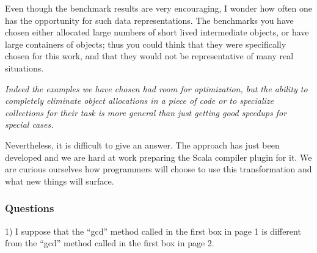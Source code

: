 \documentclass[9pt]{article}
\newenvironment{packed_item}{
\begin{itemize}
  \setlength{\itemsep}{1pt}
  \setlength{\parskip}{0.2pt}
  \setlength{\parsep}{0.2pt}
}{
  \end{itemize}
}
\newenvironment{reviewer-addr}
{ \color{OliveGreen} \framebox{{\bf FEEDBACK}} }
{  }
\newenvironment{answer}
{ \em \framebox{{\bf AUTHOR RESPONSE}} }
{  }
\begin{document}
\vspace{5mm}

\begin{reviewer-addr}
\begin{packed_item}
\item Even though the benchmark results are very encouraging, I wonder how often one has
the opportunity for such data representations. The benchmarks you have chosen either
allocated large numbers of short lived intermediate objects, or have large containers of
objects; thus you could think that they were specifically chosen for this work, and that
they would not be representative of many real situations.
\end{packed_item}
\end{reviewer-addr}

\begin{answer}
Indeed the examples we have chosen had room for optimization,
but the ability to completely eliminate object allocations in a piece of code or to specialize collections
for their task is more general than just getting good speedups for special cases.

Nevertheless, it is difficult to give an answer. The approach has just been developed and we are hard at work
preparing the Scala compiler plugin for it. We are curious ourselves how programmers will choose to
use this transformation and what new things will surface.
\end{answer}

\vspace{5mm}

\subsubsection{Questions}

\begin{reviewer-addr}
1)  I suppose that the “gcd” method called in the first box in page 1 is different from
the “gcd” method called in the first box in page 2.
\end{reviewer-addr}
\end{document}
